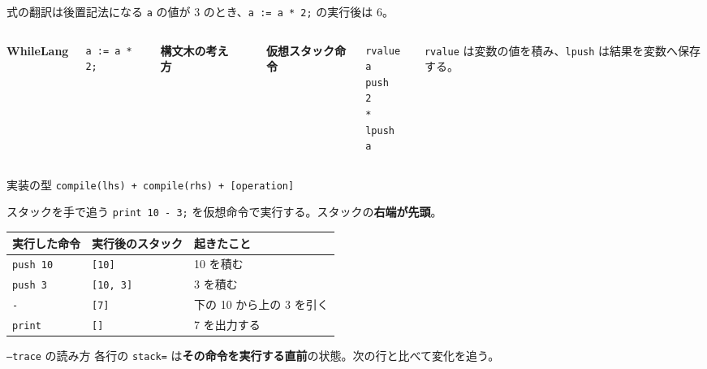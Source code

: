 \documentclass[aspectratio=169,11pt]{beamer}
\newcommand{\term}[1]{\textbf{\color{Blue}#1}}
\begin{document}
\begin{frame}[fragile]{式の翻訳は後置記法になる}
  \small\texttt{a} の値が 3 のとき、\texttt{a := a * 2;} の実行後は 6。
  \vspace{0.35em}
  \begin{columns}[T,onlytextwidth]
      \textbf{WhileLang}
      \begin{lstlisting}
a := a * 2;
      \end{lstlisting}
      \vspace{0.25em}
      \textbf{構文木の考え方}
      \begin{center}
      \end{center}
      \textbf{仮想スタック命令}
      \begin{lstlisting}
rvalue a
push   2
*
lpush  a
      \end{lstlisting}
      \small
      \texttt{rvalue} は変数の値を積み、\texttt{lpush} は結果を変数へ保存する。
  \end{columns}
  \begin{block}{実装の型}
    \texttt{compile(lhs) + compile(rhs) + [operation]}
  \end{block}
\end{frame}

\begin{frame}[fragile]{スタックを手で追う}
  \texttt{print 10 - 3;} を仮想命令で実行する。スタックの\term{右端が先頭}。
  \vspace{0.55em}
  \begin{center}
    \begin{tabular}{@{}lll@{}}
      \textbf{実行した命令} & \textbf{実行後のスタック} & \textbf{起きたこと} \\ \hline
      \texttt{push 10} & \texttt{[10]} & 10 を積む \\
      \texttt{push 3} & \texttt{[10, 3]} & 3 を積む \\
      \texttt{-} & \texttt{[7]} & 下の 10 から上の 3 を引く \\
      \texttt{print} & \texttt{[]} & 7 を出力する
    \end{tabular}
  \end{center}
  \vspace{0.45em}
  \begin{block}{\texttt{--trace} の読み方}
    各行の \texttt{stack=} は\term{その命令を実行する直前}の状態。次の行と比べて変化を追う。
  \end{block}
\end{frame}
\end{document}
